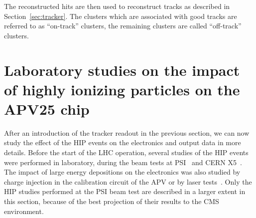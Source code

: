 
The reconstructed hits are then used to reconstruct tracks as described in Section~\ref{sec:tracker}. The clusters which are associated with good tracks are referred to as ``on-track'' clusters, the remaining clusters are called ``off-track'' clusters.


\section{Laboratory studies on the impact of highly ionizing particles on the APV25 chip~\label{sec:HIPinPast}}


After an introduction of the tracker readout in the previous section, we can now study the effect of the HIP events on the electronics and output data in more details. Before the start of the LHC operation, several studies of the HIP events were performed in laboratory, during the beam tests at PSI~\cite{Tomalin:2003aaa} and CERN X5~\cite{Bainbridge:2002bda}. The impact of large energy depositions on the electronics was also studied by charge injection in the calibration circuit of the APV or by laser tests~\cite{Adam:2005pz}. Only the HIP studies performed at the PSI beam test are described in a larger extent in this section, because of the best projection of their results to the CMS environment.

